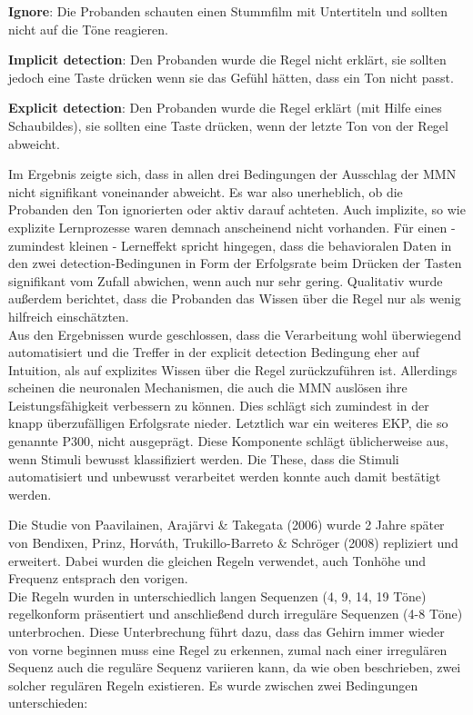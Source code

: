 \documentclass[doc,a4paper,12pt]{apa6}
\begin{document}
\begin{compactitem}
  \item \textbf{Ignore}: Die Probanden schauten einen Stummfilm mit Untertiteln und sollten nicht auf die Töne reagieren.
  \item \textbf{Implicit detection}: Den Probanden wurde die Regel nicht erklärt, sie sollten jedoch eine Taste drücken wenn sie das Gefühl hätten, dass ein Ton nicht passt.
  \item \textbf{Explicit detection}: Den Probanden wurde die Regel erklärt (mit Hilfe eines Schaubildes), sie sollten eine Taste drücken, wenn der letzte Ton von der Regel abweicht.
\end{compactitem}

Im Ergebnis zeigte sich, dass in allen drei Bedingungen der Ausschlag der MMN nicht signifikant voneinander abweicht. Es war also unerheblich, ob die Probanden den Ton ignorierten oder aktiv darauf achteten. Auch implizite, so wie explizite Lernprozesse waren demnach anscheinend nicht vorhanden. Für einen - zumindest kleinen - Lerneffekt spricht hingegen, dass die behavioralen Daten in den zwei detection-Bedingunen in Form der Erfolgsrate beim Drücken der Tasten signifikant vom Zufall abwichen, wenn auch nur sehr gering. Qualitativ wurde außerdem berichtet, dass die Probanden das Wissen über die Regel nur als wenig hilfreich einschätzten.\\
Aus den Ergebnissen wurde geschlossen, dass die Verarbeitung wohl überwiegend automatisiert und die Treffer in der explicit detection Bedingung eher auf Intuition, als auf explizites Wissen über die Regel zurückzuführen ist. Allerdings scheinen die neuronalen Mechanismen, die auch die MMN auslösen ihre Leistungsfähigkeit verbessern zu können. Dies schlägt sich zumindest in der knapp überzufälligen Erfolgsrate nieder. Letztlich war ein weiteres EKP, die so genannte P300, nicht ausgeprägt. Diese Komponente schlägt üblicherweise aus, wenn Stimuli bewusst klassifiziert werden. Die These, dass die Stimuli automatisiert und unbewusst verarbeitet werden konnte auch damit bestätigt werden.

Die Studie von Paavilainen, Arajärvi \& Takegata (2006) wurde 2 Jahre später von Bendixen, Prinz, Horváth, Trukillo-Barreto \& Schröger (2008) repliziert und erweitert. Dabei wurden die gleichen Regeln verwendet, auch Tonhöhe und Frequenz entsprach den vorigen.\\
Die Regeln wurden in unterschiedlich langen Sequenzen (4, 9, 14, 19 Töne) regelkonform präsentiert und anschließend durch irreguläre Sequenzen (4-8 Töne) unterbrochen. Diese Unterbrechung führt dazu, dass das Gehirn immer wieder von vorne beginnen muss eine Regel zu erkennen, zumal nach einer irregulären Sequenz auch die reguläre Sequenz variieren kann, da wie oben beschrieben, zwei solcher regulären Regeln existieren. Es wurde zwischen zwei Bedingungen unterschieden:
\end{document}
